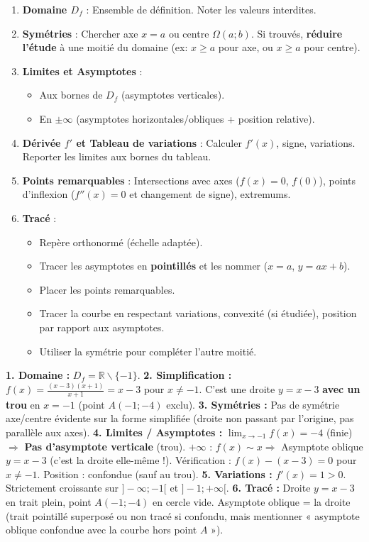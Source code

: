 \documentclass[11pt]{article}
\def\setminus{\mathbin{\backslash}}\let\smallsetminus\setminus
\begin{document}
\begin{methode}
\begin{enumerate}
\item \textbf{Domaine $D_f$} : Ensemble de définition. Noter les valeurs interdites.
\item \textbf{Symétries} : Chercher axe $x=a$ ou centre $\Omega(a;b)$. Si trouvés, \textbf{réduire l'étude} à une moitié du domaine (ex: $x \ge a$ pour axe, ou $x \ge a$ pour centre).
\item \textbf{Limites et Asymptotes} :
\begin{itemize}
\item Aux bornes de $D_f$ (asymptotes verticales).
\item En $\pm\infty$ (asymptotes horizontales/obliques + position relative).
\end{itemize}
\item \textbf{Dérivée $f'$ et Tableau de variations} : Calculer $f'(x)$, signe, variations. Reporter les limites aux bornes du tableau.
\item \textbf{Points remarquables} : Intersections avec axes ($f(x)=0$, $f(0)$), points d'inflexion ($f''(x)=0$ et changement de signe), extremums.
\item \textbf{Tracé} :
\begin{itemize}
\item Repère orthonormé (échelle adaptée).
\item Tracer les asymptotes en \textbf{pointillés} et les nommer ($x=a$, $y=ax+b$).
\item Placer les points remarquables.
\item Tracer la courbe en respectant variations, convexité (si étudiée), position par rapport aux asymptotes.
\item Utiliser la symétrie pour compléter l'autre moitié.
\end{itemize}
\end{enumerate}
\end{methode}

\begin{exoresolu}[Étude complète : $f(x)=\frac{x^2-2x-3}{x+1}$]
\textbf{1. Domaine :} $D_f=\mathbb{R}\setminus\{-1\}$.
\textbf{2. Simplification :} $f(x)=\frac{(x-3)(x+1)}{x+1}=x-3$ pour $x\neq -1$.
C'est une droite $y=x-3$ \textbf{avec un trou} en $x=-1$ (point $A(-1;-4)$ exclu).
\textbf{3. Symétries :} Pas de symétrie axe/centre évidente sur la forme simplifiée (droite non passant par l'origine, pas parallèle aux axes).
\textbf{4. Limites / Asymptotes :}
$\lim_{x\to -1}f(x)=-4$ (finie) $\Rightarrow$ \textbf{Pas d'asymptote verticale} (trou).
$+\infty$ : $f(x)\sim x \Rightarrow$ Asymptote oblique $y=x-3$ (c'est la droite elle-même !).
Vérification : $f(x)-(x-3)=0$ pour $x\neq -1$. Position : confondue (sauf au trou).
\textbf{5. Variations :} $f'(x)=1>0$. Strictement croissante sur $]-\infty;-1[$ et $]-1;+\infty[$.
\textbf{6. Tracé :} Droite $y=x-3$ en trait plein, point $A(-1;-4)$ en cercle vide. Asymptote oblique = la droite (trait pointillé superposé ou non tracé si confondu, mais mentionner « asymptote oblique confondue avec la courbe hors point $A$ »).
\end{exoresolu}
\end{document}

